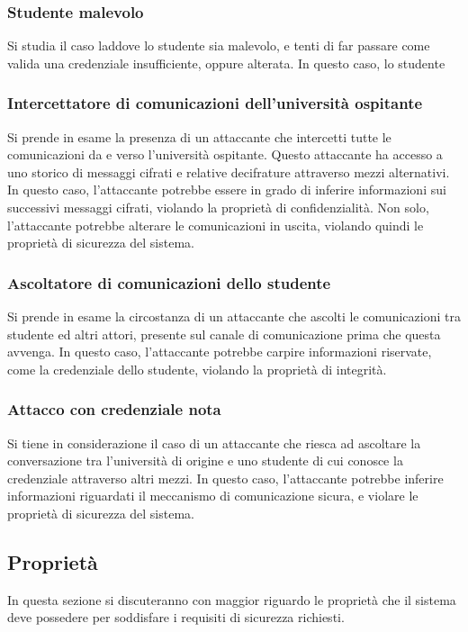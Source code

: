 \documentclass[a4paper,12pt]{article}
\begin{document}
\subsubsection{Studente malevolo}
Si studia il caso laddove lo studente sia malevolo, e tenti di far passare come valida una credenziale insufficiente, oppure alterata. In questo caso, lo studente 
\subsubsection{Intercettatore di comunicazioni dell'università ospitante}
Si prende in esame la presenza di un attaccante che intercetti tutte le comunicazioni da e verso l'università ospitante. Questo attaccante ha accesso a uno storico di messaggi cifrati e relative decifrature attraverso mezzi alternativi. 
\newline In questo caso, l'attaccante potrebbe essere in grado di inferire informazioni sui successivi messaggi cifrati, violando la proprietà di confidenzialità. Non solo, l'attaccante potrebbe alterare le comunicazioni in uscita, violando quindi le proprietà di sicurezza del sistema.
\subsubsection{Ascoltatore di comunicazioni dello studente}
Si prende in esame la circostanza di un attaccante che ascolti le comunicazioni tra studente ed altri attori, presente sul canale di comunicazione prima che questa avvenga. In questo caso, l'attaccante potrebbe carpire informazioni riservate, come la credenziale dello studente, violando la proprietà di integrità.
\subsubsection{Attacco con credenziale nota}
Si tiene in considerazione il caso di un attaccante che riesca ad ascoltare la conversazione tra l'università di origine e uno studente di cui conosce la credenziale attraverso altri mezzi.
\newline In questo caso, l'attaccante potrebbe inferire informazioni riguardati il meccanismo di comunicazione sicura, e violare le proprietà di sicurezza del sistema. 

\subsection{Proprietà}
In questa sezione si discuteranno con maggior riguardo le proprietà che il sistema deve possedere per soddisfare i requisiti di sicurezza richiesti.
\end{document}
